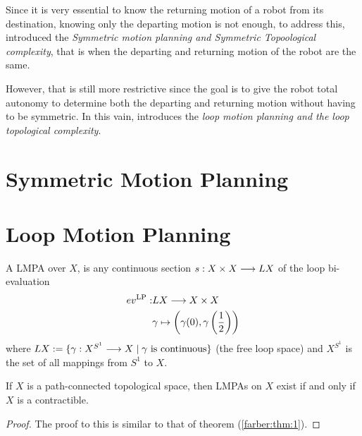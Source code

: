 Since it is very essential to know the returning motion of a robot from its destination, knowing only the departing motion is not enough, to address this, \cite{farber2007symmetric} introduced the \emph{Symmetric motion planning and Symmetric Topoological complexity}, that is when the departing and returning motion of the robot are the same.

However, that is still more restrictive since the goal is to give the robot total autonomy to determine both the departing and returning motion without having to be symmetric. In this vain, \cite{derfoufi2015loop} introduces the \emph{loop motion planning and the loop topological complexity}.

\section{Symmetric Motion Planning}
\begin{defn}

\end{defn}

\section{Loop Motion Planning}
\begin{defn}
    A LMPA over $X$, is any continuous section $s: X \times X \longrightarrow LX$ of the loop bi-evaluation
    \begin{align*}
        ev^{\mathrm{LP}} : & LX \longrightarrow X \times X                                                 \\
                         & \gamma \mapsto \left(\gamma(0), \gamma \left(\frac12\right) \right)
    \end{align*}
    where $LX := \{\gamma : X ^{S^1} \longrightarrow X \mid \gamma \text{ is continuous}\}$ (the free loop space) and $X^{S^1}$ is the set of all mappings from $S^1$ to $X$.
\end{defn}

\begin{thm}\cite{derfoufi2015loop}
    If $X$ is a path-connected topological space, then LMPAs on $X$ exist if and only if $X$ is a contractible.
\end{thm}

\begin{proof}
    The proof to this is similar to that of theorem (\ref{farber:thm:1}).
\end{proof}


